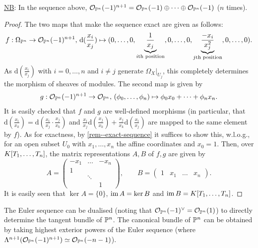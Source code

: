 \documentclass[a4paper,11pt]{article}
\begin{document}
			\noindent\underline{NB}: In the sequence above, $\O_{\P^n}(-1)^{n+1}=\O_{\P^n}(-1)\oplus\dots\oplus\O_{\P^n}(-1)$ ($n$ times). 

			\begin{proof}
				The two maps that make the sequence exact are given as follows:
				\begin{equation*}
					f:\Omega_{\P^n}\rightarrow\O_{\P^n}(-1)^{n+1},\,\mathrm{d}(\frac{x_i}{x_j})\mapsto (0,\dots,0,\underbrace{\frac{1}{x_j}}_{i\text{th position}},0,\dots,0,\underbrace{\frac{-x_i}{x_j^2}}_{j\text{th position}},0,\dots,0).
				\end{equation*}
				As $\mathrm{d}(\frac{x_i}{x_j})$ with $i=0,\dots,n$ and $i\neq j$ generate $\Omega_X|_{U_j}$, this completely determines the morphism of sheaves of modules. The second map is given by
				\begin{equation*}
					g:\O_{\P^n}(-1)^{n+1}\rightarrow\O_{\P^n},\,(\phi_0,\dots,\phi_n)\mapsto\phi_0x_0+\dots+\phi_nx_n.
				\end{equation*}
				It is easily checked that $f$ and $g$ are well-defined morphisms (in particular, that $\mathrm{d}(\frac{x_i}{x_k})=\mathrm{d}(\frac{x_i}{x_j}\cdot\frac{x_j}{x_k})$ and $\frac{x_i}{x_j}\mathrm{d}(\frac{x_j}{x_k})+\frac{x_j}{x_k}\mathrm{d}(\frac{x_i}{x_j})$ are mapped to the same element by $f$). As for exactness, by \autoref{rem--exact-sequence} it suffices to show this, w.l.o.g., for an open subset $U_0$ with $x_1,\dots,x_n$ the affine coordinates and $x_0=1$. Then, over $\K$, the matrix representations $A,B$ of $f,g$ are given by
				\begin{equation*}
					A=\begin{pmatrix}
						-x_1 & \dots & -x_n\\
						1 & &\\
						& \ddots &\\
						& & 1
					\end{pmatrix},\qquad B=\begin{pmatrix}
						1 & x_1 & \dots & x_n
					\end{pmatrix}.
				\end{equation*}
				It is easily seen that $\ker A=\{0\}$, $\im A=\ker B$ and $\im B=\K$.
			\end{proof}

			\begin{remark}
				The Euler sequence can be dualised (noting that $\O_{\P^n}(-1)^\vee=\O_{\P^n}(1)$) to directly determine the tangent bundle of $\P^n$. The canonical bundle of $\P^n$ can be obtained by taking highest exterior powers of the Euler sequence (where $\Lambda^{n+1}(\O_{\P^n}(-1)^{n+1})\simeq\O_{\P^n}(-n-1)$).
			\end{remark}
\end{document}

